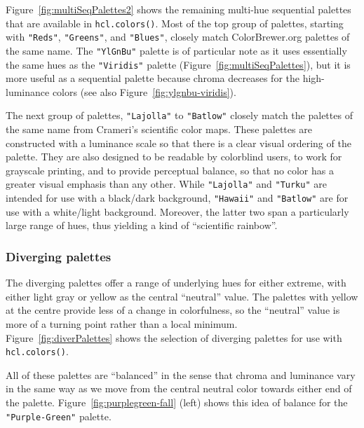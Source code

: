 Figure~\ref{fig:multiSeqPalettes2} shows the remaining multi-hue
sequential palettes that are available in \texttt{hcl.colors()}.
Most of the top group of palettes, starting with \texttt{"Reds"}, \texttt{"Greens"},
and \texttt{"Blues"}, closely match ColorBrewer.org palettes
of the same name. The \texttt{"YlGnBu"} palette is of particular note
as it uses essentially the same hues as the \texttt{"Viridis"} palette
(Figure~\ref{fig:multiSeqPalettes}), but it is more useful as a
sequential palette because chroma decreases for the high-luminance
colors (see also Figure~\ref{fig:ylgnbu-viridis}).

The next group of palettes, \texttt{"Lajolla"} to \texttt{"Batlow"} closely match the
palettes of the same name from Crameri's scientific color maps.
These palettes are constructed with a luminance scale
so that there is a clear visual ordering of the palette.
They are also designed to be readable by colorblind users,
to work for grayscale printing, and to provide perceptual balance, so
that no color has a greater visual emphasis than any other.
While \texttt{"Lajolla"} and \texttt{"Turku"} are intended for use with a black/dark
background, \texttt{"Hawaii"} and \texttt{"Batlow"} are for use with a white/light background.
Moreover, the latter two span a particularly large range of hues, thus
yielding a kind of ``scientific rainbow''.

\hypertarget{diverging-palettes}{%
\subsubsection{Diverging palettes}\label{diverging-palettes}}

The diverging palettes offer a range of underlying hues
for either extreme, with either light gray or yellow as the central ``neutral''
value. The palettes with yellow at the centre provide less of a
change in colorfulness, so the ``neutral'' value is more of
a turning point rather than a local minimum.\\
Figure~\ref{fig:diverPalettes} shows the selection of diverging
palettes for use with \texttt{hcl.colors()}.

All of these palettes are ``balanced'' in the sense that chroma and luminance
vary in the same way as we move from the central neutral color towards
either end of the palette.
Figure~\ref{fig:purplegreen-fall} (left) shows this idea of balance for
the \texttt{"Purple-Green"} palette.

